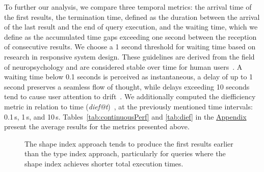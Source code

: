  


To further our analysis, we compare three temporal metrics: the arrival time of the first results, the termination time, defined as the duration between the arrival of the last result and the end of query execution, and the waiting time, which we define as the accumulated time gaps exceeding one second between the reception of consecutive results.
We choose a 1 second threshold for waiting time based on research in responsive system design.
These guidelines are derived from the field of neuropsychology and are considered stable over time for human users~\cite{uxtigersNeedSpeed, Nielsen1993}.
A waiting time below 0.1 seconds is perceived as instantaneous, a delay of up to 1 second preserves a seamless flow of thought, while delays exceeding 10 seconds tend to cause user attention to drift~\cite{Nielsen1993}.
We additionally computed the diefficiency metric in relation to time (\textit{dief@t})~\cite{acosta2017diefficiency}, at the previously mentioned time intervals: 0.1\,s, 1\,s, and 10\,s.
Tables~\ref{tab:continuousPerf} and \ref{tab:dief}  in the \hyperref[sec:appendix]{Appendix} present the average results for the metrics presented above.


\begin{figure}
    \centering
    
    \caption{The shape index approach tends to produce the first results earlier than the type index approach, particularly for queries where the shape index achieves shorter total execution times.}
    \label{fig:first_res}
\end{figure}


